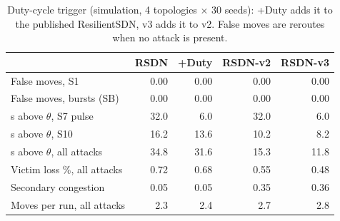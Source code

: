 \begin{table}[t]\centering\scriptsize
\caption{Duty-cycle trigger (simulation, 4 topologies $\times$ 30 seeds): +Duty adds it to the published ResilientSDN, v3 adds it to v2. False moves are reroutes when no attack is present.}
\label{tab:v3}
\begin{tabular}{lrrrr}
\toprule
 & RSDN & +Duty & RSDN-v2 & RSDN-v3\\
\midrule
False moves, S1 & 0.00 & 0.00 & 0.00 & 0.00\\
False moves, bursts (SB) & 0.00 & 0.00 & 0.00 & 0.00\\
s above $\theta$, S7 pulse & 32.0 & 6.0 & 32.0 & 6.0\\
s above $\theta$, S10 & 16.2 & 13.6 & 10.2 & 8.2\\
s above $\theta$, all attacks & 34.8 & 31.6 & 15.3 & 11.8\\
Victim loss \%, all attacks & 0.72 & 0.68 & 0.55 & 0.48\\
Secondary congestion & 0.05 & 0.05 & 0.35 & 0.36\\
Moves per run, all attacks & 2.3 & 2.4 & 2.7 & 2.8\\
\bottomrule
\end{tabular}
\end{table}